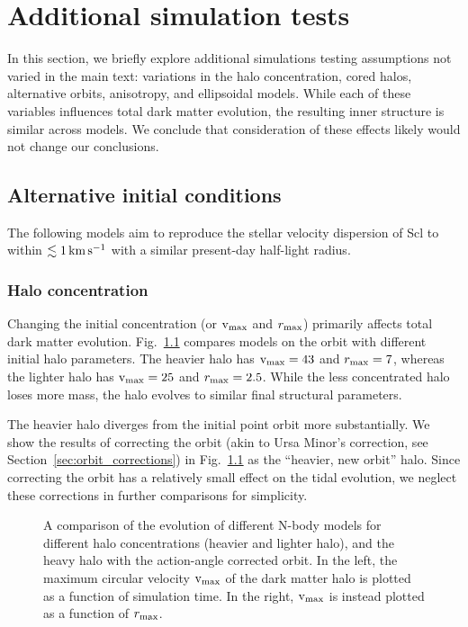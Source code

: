 \chapter{Additional simulation tests}\label{sec:extra_results}

In this section, we briefly explore additional simulations testing
assumptions not varied in the main text: variations in the halo
concentration, cored halos, alternative orbits, anisotropy, and
ellipsoidal models. While each of these variables influences total dark
matter evolution, the resulting inner structure is similar across
models. We conclude that consideration of these effects likely would not
change our conclusions.

\section{Alternative initial
conditions}\label{alternative-initial-conditions}

The following models aim to reproduce the stellar velocity dispersion of
Scl to within \(\lesssim 1\,{\rm km\,s^{-1}}\) with a similar present-day half-light
radius.

\subsection{Halo concentration}\label{halo-concentration}

Changing the initial concentration (or \({\rm v}_{\rm max}\) and \(r_{\rm max}\))
primarily affects total dark matter evolution.
Fig.~\ref{fig:tidal_tracks_concentration} compares models on the
\smallperi{} orbit with different initial halo parameters. The heavier
halo has \({\rm v}_{\rm max}=43\) and \(r_{\rm max}=7\), whereas the lighter halo has
\({\rm v}_{\rm max}=25\) and \(r_{\rm max}=2.5\). While the less concentrated halo loses
more mass, the halo evolves to similar final structural parameters.

The heavier halo diverges from the initial point orbit more
substantially. We show the results of correcting the orbit (akin to Ursa
Minor's correction, see Section~\ref{sec:orbit_corrections}) in
Fig.~\ref{fig:tidal_tracks_concentration} as the ``heavier, new orbit''
halo. Since correcting the orbit has a relatively small effect on the
tidal evolution, we neglect these corrections in further comparisons for
simplicity.

\begin{figure}
\centering
{}
\caption[Tidal dependence on halo concentration]{A comparison of the
evolution of different N-body models for different halo concentrations
(heavier and lighter halo), and the heavy halo with the action-angle
corrected orbit. In the left, the maximum circular velocity \({\rm v}_{\rm max}\) of
the dark matter halo is plotted as a function of simulation time. In the
right, \({\rm v}_{\rm max}\) is instead plotted as a function of
\(r_{\rm max}\).}\label{fig:tidal_tracks_concentration}
\end{figure}

